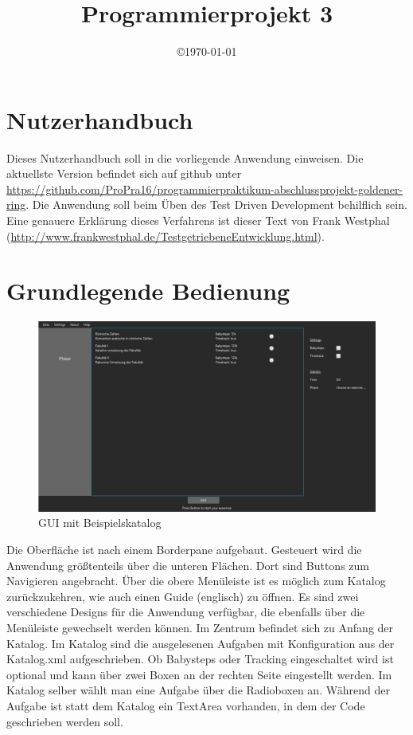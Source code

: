 \documentclass[12pt]{article}
\title{Programmierprojekt 3}
\date{\copyright\today}
\begin{document}
	
	\newpage
	
	\section{Nutzerhandbuch}
	
	Dieses Nutzerhandbuch soll in die vorliegende Anwendung einweisen. \newline Die aktuellste Version befindet sich auf github unter \url{https://github.com/ProPra16/programmierpraktikum-abschlussprojekt-goldener-ring}.
	Die Anwendung soll beim Üben des Test Driven Development behilflich sein. Eine genauere Erklärung dieses Verfahrens ist dieser Text von Frank Westphal (\url{http://www.frankwestphal.de/TestgetriebeneEntwicklung.html}).
	\newpage
	\section{Grundlegende Bedienung}
	
	    \begin{figure} [htbp]
	    	\includegraphics[width=1\textwidth]{figures/gui}
	    	\caption{GUI mit Beispielskatalog}
	    	\label{gui}
	    \end{figure}
	    	
		Die Oberfläche ist nach einem Borderpane aufgebaut. 
		Gesteuert wird die Anwendung größtenteils über die unteren Flächen. Dort sind Buttons zum Navigieren angebracht. \newline
		Über die obere Menüleiste ist es möglich zum Katalog zurückzukehren, wie auch einen Guide (englisch) zu öffnen.
		Es sind zwei verschiedene Designs für die Anwendung verfügbar, die ebenfalls über die Menüleiste gewechselt werden können. \newline
		Im Zentrum befindet sich zu Anfang der Katalog. Im Katalog sind die ausgelesenen Aufgaben mit Konfiguration aus der Katalog.xml aufgeschrieben. \newline Ob Babysteps oder Tracking eingeschaltet wird ist optional und kann über zwei Boxen an der rechten Seite eingestellt werden. Im Katalog selber wählt man eine Aufgabe über die Radioboxen an.
		Während der Aufgabe ist statt dem Katalog ein TextArea vorhanden, in dem der Code geschrieben werden soll.
		
\end{document}
